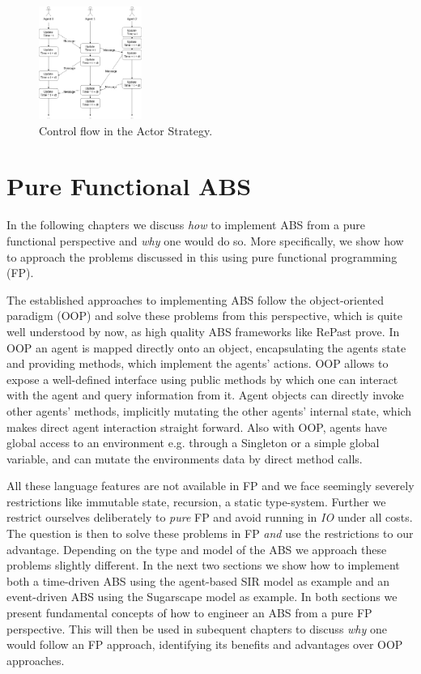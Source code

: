 \begin{figure}[H]
	\centering
	\includegraphics[width=0.3\textwidth, angle=0]{./fig/implabs/actor.png}
	\caption{Control flow in the Actor Strategy.}
	\label{fig:strategy_act}
\end{figure}

\section{Pure Functional ABS}
In the following chapters we discuss \textit{how} to implement ABS from a pure functional perspective and \textit{why} one would do so. More specifically, we show how to approach the problems discussed in this using pure functional programming (FP).

The established approaches to implementing ABS follow the object-oriented paradigm (OOP) and solve these problems from this perspective, which is quite well understood by now, as high quality ABS frameworks like RePast \cite{north_complex_2013} prove. In OOP an agent is mapped directly onto an object, encapsulating the agents state and providing methods, which implement the agents' actions. OOP allows to expose a well-defined interface using public methods by which one can interact with the agent and query information from  it. Agent objects can directly invoke other agents' methods, implicitly mutating the other agents' internal state, which makes direct agent interaction straight forward. Also with OOP, agents have global access to an environment e.g. through a Singleton or a simple global variable, and can mutate the environments data by direct method calls.

All these language features are not available in FP and we face seemingly severely restrictions like immutable state, recursion, a static type-system. Further we restrict ourselves deliberately to \textit{pure} FP and avoid running in \textit{IO} under all costs. The question is then to solve these problems in FP \textit{and} use the restrictions to our advantage. Depending on the type and model of the ABS we approach these problems slightly different. In the next two sections we show how to implement both a time-driven ABS using the agent-based SIR model as example and an event-driven ABS using the Sugarscape model as example. In both sections we present fundamental concepts of how to engineer an ABS from a pure FP perspective. This will then be used in subequent chapters to discuss \textit{why} one would follow an FP approach, identifying its benefits and advantages over OOP approaches.